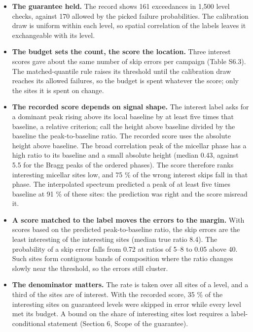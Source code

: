 \documentclass{iopjournal}
\providecommand{\tightlist}{\setlength{\itemsep}{0pt}\setlength{\parskip}{0pt}}
\begin{document}
\begin{itemize}
\tightlist
\item
  \textbf{The guarantee held.} The record shows 161 exceedances in 1,500 level checks, against 170 allowed by the picked failure probabilities. The calibration draw is uniform within each level, so spatial correlation of the labels leaves it exchangeable with its level.
\item
  \textbf{The budget sets the count, the score the location.} Three interest scores gave about the same number of skip errors per campaign (Table S6.3). The matched-quantile rule raises its threshold until the calibration draw reaches its allowed failures, so the budget is spent whatever the score; only the sites it is spent on change.
\item
  \textbf{The recorded score depends on signal shape.} The interest label asks for a dominant peak rising above its local baseline by at least five times that baseline, a relative criterion; call the height above baseline divided by the baseline the peak-to-baseline ratio. The recorded score uses the absolute height above baseline. The broad correlation peak of the micellar phase has a high ratio to its baseline and a small absolute height (median 0.43, against 5.5 for the Bragg peaks of the ordered phases). The score therefore ranks interesting micellar sites low, and 75 \% of the wrong interest skips fall in that phase. The interpolated spectrum predicted a peak of at least five times baseline at 91 \% of these sites: the prediction was right and the score misread it.
\item
  \textbf{A score matched to the label moves the errors to the margin.} With scores based on the predicted peak-to-baseline ratio, the skip errors are the least interesting of the interesting sites (median true ratio 8.4). The probability of a skip error falls from 0.72 at ratios of 5--8 to 0.05 above 40. Such sites form contiguous bands of composition where the ratio changes slowly near the threshold, so the errors still cluster.
\item
  \textbf{The denominator matters.} The rate is taken over all sites of a level, and a third of the sites are of interest. With the recorded score, 35 \% of the interesting sites on guaranteed levels were skipped in error while every level met its budget. A bound on the share of interesting sites lost requires a label-conditional statement (Section 6, Scope of the guarantee).
\end{itemize}
\end{document}
